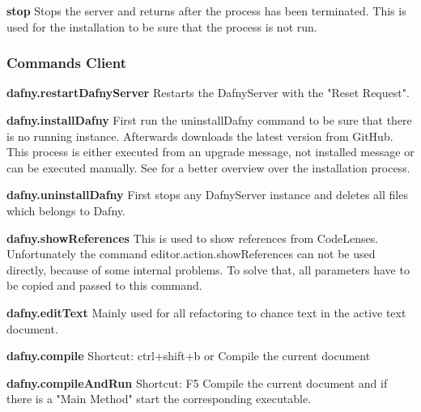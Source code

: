 \textbf{stop}
Stops the server and returns after the process has been terminated. This is used for the installation to be sure that the process is not run. \newline

\subsubsection{Commands Client}

\textbf{dafny.restartDafnyServer}
Restarts the DafnyServer with the "Reset Request".\newline

\textbf{dafny.installDafny}
First run the uninstallDafny command to be sure that there is no running instance. Afterwards downloads the latest version from GitHub. This process is either executed from an upgrade message, not installed message or can be executed manually. 
See  for a better overview over the installation process. \newline

\textbf{dafny.uninstallDafny}
First stops any DafnyServer instance and deletes all files which belongs to Dafny. \newline

\textbf{dafny.showReferences}
This is used to show references from CodeLenses. Unfortunately the command editor.action.showReferences can not be used directly, because of some internal problems. To solve that, all parameters have to be copied and passed to this command. \newline

\textbf{dafny.editText}
Mainly used for all refactoring to chance text in the active text document. \newline

\textbf{dafny.compile}
Shortcut: ctrl+shift+b or %
\newline
Compile the current document \newline

\textbf{dafny.compileAndRun}
Shortcut: F5
\newline
Compile the current document and if there is a "Main Method" start the corresponding executable. \newline


